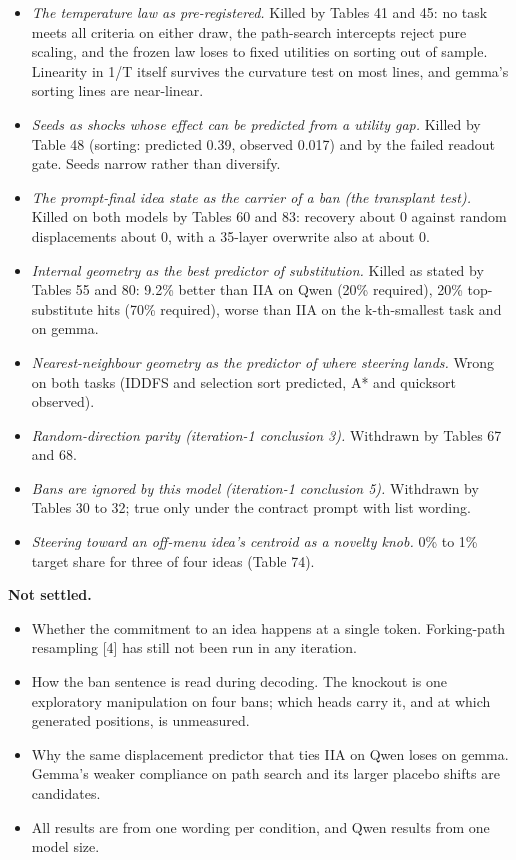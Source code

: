 \documentclass[11pt,letterpaper]{article}
\begin{document}
\begin{itemize}
\item \emph{The temperature law as pre-registered.} Killed by Tables 41 and 45: no task meets all criteria on either draw, the path-search intercepts reject pure scaling, and the frozen law loses to fixed utilities on sorting out of sample. Linearity in 1/T itself survives the curvature test on most lines, and gemma's sorting lines are near-linear.
\item \emph{Seeds as shocks whose effect can be predicted from a utility gap.} Killed by Table 48 (sorting: predicted 0.39, observed 0.017) and by the failed readout gate. Seeds narrow rather than diversify.
\item \emph{The prompt-final idea state as the carrier of a ban (the transplant test).} Killed on both models by Tables 60 and 83: recovery about 0 against random displacements about 0, with a 35-layer overwrite also at about 0.
\item \emph{Internal geometry as the best predictor of substitution.} Killed as stated by Tables 55 and 80: 9.2\% better than IIA on Qwen (20\% required), 20\% top-substitute hits (70\% required), worse than IIA on the k-th-smallest task and on gemma.
\item \emph{Nearest-neighbour geometry as the predictor of where steering lands.} Wrong on both tasks (IDDFS and selection sort predicted, A* and quicksort observed).
\item \emph{Random-direction parity (iteration-1 conclusion 3).} Withdrawn by Tables 67 and 68.
\item \emph{Bans are ignored by this model (iteration-1 conclusion 5).} Withdrawn by Tables 30 to 32; true only under the contract prompt with list wording.
\item \emph{Steering toward an off-menu idea's centroid as a novelty knob.} 0\% to 1\% target share for three of four ideas (Table 74).
\end{itemize}
\textbf{Not settled.}

\begin{itemize}
\item Whether the commitment to an idea happens at a single token. Forking-path resampling [4] has still not been run in any iteration.
\item How the ban sentence is read during decoding. The knockout is one exploratory manipulation on four bans; which heads carry it, and at which generated positions, is unmeasured.
\item Why the same displacement predictor that ties IIA on Qwen loses on gemma. Gemma's weaker compliance on path search and its larger placebo shifts are candidates.
\item All results are from one wording per condition, and Qwen results from one model size.
\end{itemize}
\end{document}
